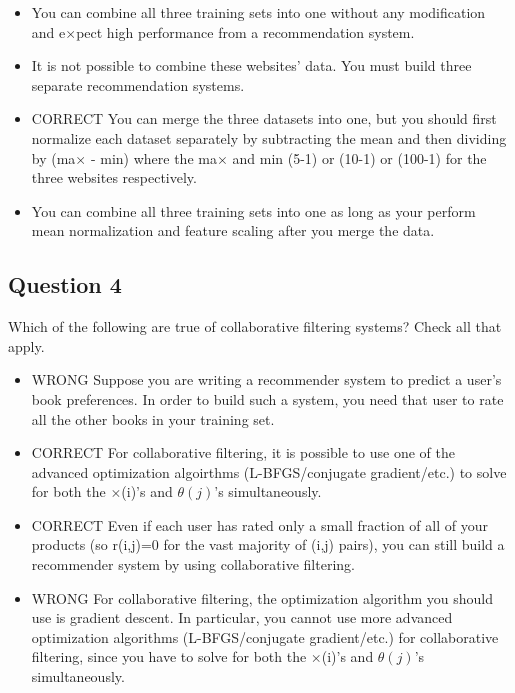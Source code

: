 \documentclass[11pt]{article} %
\begin{document}
\begin{itemize}
\item You can combine all three training sets into one without any modification and e$ \times $pect high performance from a recommendation system.

\item It is not possible to combine these websites' data. You must build three separate recommendation systems.

\item CORRECT You can merge the three datasets into one, but you should first normalize each dataset separately by subtracting the mean and then dividing by (ma$ \times $ - min) where the ma$ \times $ and min (5-1) or (10-1) or (100-1) for the three websites respectively.

\item You can combine all three training sets into one as long as your perform mean normalization and feature scaling after you merge the data.

\end{itemize}

\subsection*{Question 4 } 
Which of the following are true of collaborative filtering systems? Check all that apply.

\begin{itemize}

\item WRONG Suppose you are writing a recommender system to predict a user's book preferences. In order to build such a system, you need that user to rate all the other books in your training set.

\item CORRECT For collaborative filtering, it is possible to use one of the advanced optimization algoirthms (L-BFGS/conjugate gradient/etc.) to solve for both the $ \times $(i)'s and $\theta(j)$'s simultaneously.

\item CORRECT Even if each user has rated only a small fraction of all of your products (so r(i,j)=0 for the vast majority of (i,j) pairs), you can still build a recommender system by using collaborative filtering.

\item WRONG For collaborative filtering, the optimization algorithm you should use is gradient descent. In particular, you cannot use more advanced optimization algorithms (L-BFGS/conjugate gradient/etc.) for collaborative filtering, since you have to solve for both the $ \times $(i)'s and $\theta(j)$'s simultaneously.

\end{itemize}
\end{document}
